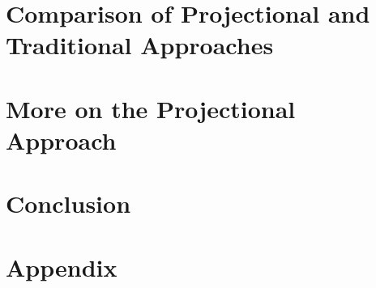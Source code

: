 \documentclass[11pt,a4paper,bibtotoc,idxtotoc,headsepline,footsepline,footexclude,BCOR12mm,DIV13,hidelinks]{scrbook}
\begin{document}
		\part[Comparison of Projectional and Traditional Approaches]{Comparison of Projectional and Traditional Approaches}
		\label{part:comparison}
		
		
		
		\part[More on the Projectional Approach]{More on the Projectional Approach}
		\label{part:moreprojection}
		
		
		
		
		\part[Conclusion]{Conclusion}
		\label{part:conclusion}
		
		
		
		
		
		\part*{Appendix}
		
		\appendix %
		
		
		
	


  \clearemptydoublepage
  
	
	
 
\end{document}
